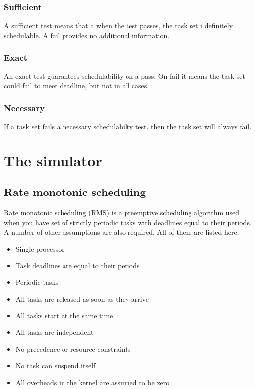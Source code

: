 \documentclass{acm_proc_article-sp}
\begin{document}
\subsubsection*{Sufficient}
A sufficient test means that a when the test passes, the task set i definitely schedulable. A fail provides no additional information.	
\subsubsection*{Exact}
An exact test guarantees schedulability on a pass. On fail it means the task set could fail to meet deadline, but not in all cases.
\subsubsection*{Necessary}
If a task set fails a necessary schedulabilty test, then the task set will always fail.



\section{The simulator}
\subsection{Rate monotonic scheduling}
Rate monotonic scheduling (RMS) is a preemptive scheduling algorithm used when you have set of strictly periodic tasks with deadlines equal to their periods. A number of other assumptions are also required. All of them are listed here.
\begin{itemize}
\item Single processor
\item Task deadlines are equal to their periods
\item Periodic tasks
\item All tasks are released as soon as they arrive
\item All tasks start at the same time
\item All tasks are independent
\item No precedence or resource constraints
\item No task can suspend itself
\item All overheads in the kernel are assumed to be zero
\end{itemize}
\end{document}
